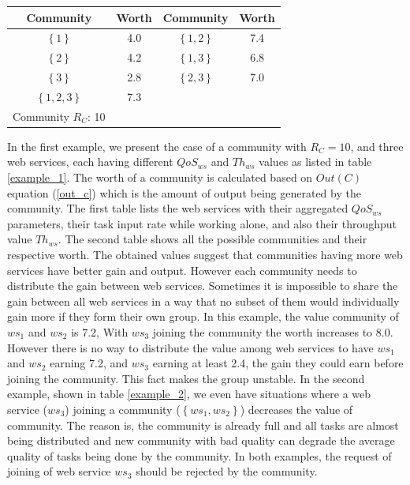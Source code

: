 \begin{table}[!t]
\renewcommand{\arraystretch}{1.3}
\label{example_2_2}
\centering
\begin{tabular}{c c || c c}
\hline
Community & Worth & Community & Worth\\
\hline
$\left\{1\right\}$ & 4.0 & $\left\{1,2\right\}$ & 7.4\\
$\left\{2\right\}$ & 4.2 & $\left\{1,3\right\}$ & 6.8\\
$\left\{3\right\}$ & 2.8 & $\left\{2,3\right\}$ & 7.0\\
$\left\{1,2,3\right\}$ & 7.3\\
\hline
Community $R_C$: 10\\
\hline
\end{tabular}
\end{table}

In the first example,  we present the case of a community with $R_C =10 $, and three web services, each having different $QoS_{ws}$ and $Th_{ws}$ values as listed in table \ref{example_1}. The worth of a community is calculated based on $Out(C)$ equation (\ref{out_c}) which is the amount of output being generated by the community. The first table  lists the web services with their aggregated $QoS_{ws}$ parameters, their task input rate while working alone, and also their  throughput value $Th_{ws}$. The second table shows all the possible communities and their respective worth. The obtained values suggest that  communities having more web services have better gain and output. However each community needs to  distribute the gain between web services. Sometimes it is impossible to share the gain between all web services in a way that no subset of them would individually gain more if they form their own group. In this example, the value community of ${ws_1}$ and ${ws_2}$ is 7.2, With ${ws_3}$ joining the community the worth increases to 8.0. However there is no way to distribute the value among web services to have  ${ws_1}$ and ${ws_2}$  earning 7.2, and ${ws_3}$ earning at least 2.4, the gain they could earn before joining the community. This fact makes the group unstable. In the second  example, shown in table \ref{example_2}, we even have situations where a web service (${ws_3}$) joining a community ($\left\{ws_1,ws_2\right\}$) decreases the value of community. The reason is, the community is already full and all tasks are almost being distributed and new community with bad quality can degrade the average quality of tasks being done by the community. In both examples, the request of joining of web service ${ws_3}$ should be rejected by the community.

